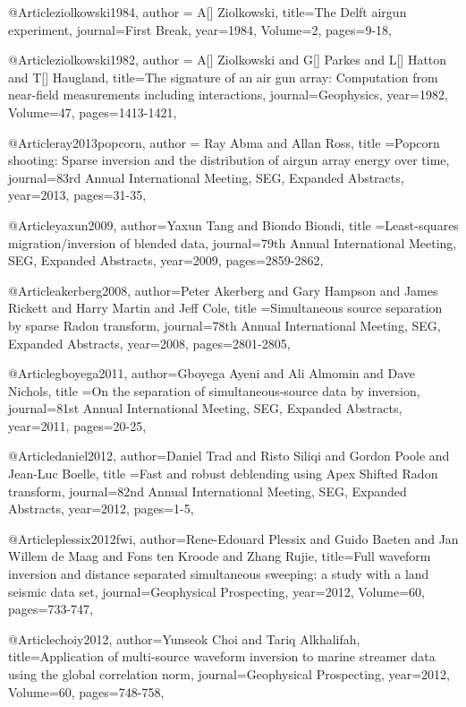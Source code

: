 {@Article{ziolkowski1984,
  author = {A[] Ziolkowski},
  title={The Delft airgun experiment},
  journal={First Break},
  year=1984,
  Volume=2,
  pages={9-18},
}

@Article{ziolkowski1982,
  author = {A[] Ziolkowski and G[] Parkes and L[] Hatton and T[] Haugland},
  title={The signature of an air gun array:
Computation from near-field measurements including interactions},
  journal={Geophysics},
  year=1982,
  Volume=47,
  pages={1413-1421},
}

@Article{ray2013popcorn,
  author = {Ray Abma and Allan Ross},
  title ={Popcorn shooting: Sparse inversion and the distribution of airgun array energy over time},
  journal={83rd Annual International Meeting, SEG, Expanded Abstracts},
  year=2013,
  pages={31-35},
}

@Article{yaxun2009,
  author={Yaxun Tang and Biondo Biondi},
  title ={Least-squares migration/inversion of blended data},
  journal={79th Annual International Meeting, SEG, Expanded Abstracts},
  year=2009,
  pages={2859-2862},
}

@Article{akerberg2008,
  author={Peter Akerberg and Gary Hampson and James Rickett and Harry Martin and Jeff Cole},
  title ={Simultaneous source separation by sparse Radon transform},
  journal={78th Annual International Meeting, SEG, Expanded Abstracts},
  year=2008,
  pages={2801-2805},
}

@Article{gboyega2011,
  author={Gboyega Ayeni and Ali Almomin and Dave Nichols},
  title ={On the separation of simultaneous-source data by inversion},
  journal={81st Annual International Meeting, SEG, Expanded Abstracts},
  year=2011,
  pages={20-25},
}

@Article{daniel2012,
  author={Daniel Trad and Risto Siliqi and Gordon Poole and Jean-Luc Boelle},
  title ={Fast and robust deblending using Apex Shifted Radon transform},
  journal={82nd Annual International Meeting, SEG, Expanded Abstracts},
  year=2012,
  pages={1-5},
}

@Article{plessix2012fwi,
  author={Rene-Edouard Plessix and Guido Baeten and Jan Willem de Maag and Fons ten Kroode and Zhang Rujie},
  title={Full waveform inversion and distance separated simultaneous sweeping: a study with a land seismic data set},
  journal={Geophysical Prospecting},
  year=2012,
  Volume=60,
  pages={733-747},
}

@Article{choiy2012,
  author={Yunseok Choi and Tariq Alkhalifah},
  title={Application of multi-source waveform inversion to marine streamer data using the global correlation norm},
  journal={Geophysical Prospecting},
  year=2012,
  Volume=60,
  pages={748-758},
}


}
